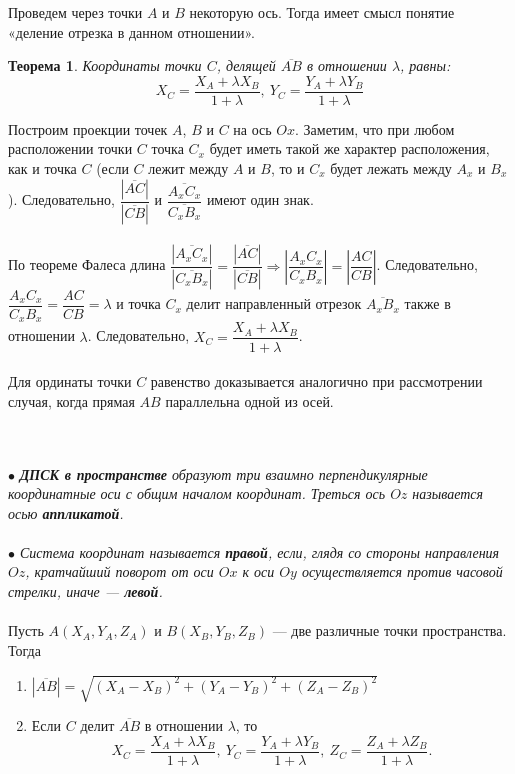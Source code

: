 Проведем через точки $A$ и $B$ некоторую ось. Тогда имеет смысл понятие «деление отрезка в данном отношении».
\newtheorem*{t2_2}{Теорема}\begin{t2_2}Координаты точки $C$, делящей $\overline{AB}$ в отношении $\lambda$, равны: $$X_C = \dfrac{X_A + \lambda X_B}{1+\lambda},\ Y_C = \dfrac{Y_A + \lambda Y_B}{1+\lambda}$$\end{t2_2}\begin{Proof}
	Построим проекции точек $A$, $B$ и $C$ на ось $Ox$. Заметим, что при любом расположении точки $C$ точка $C_x$ будет иметь такой же характер расположения, как и точка $C$ (если $C$ лежит между $A$ и $B$, то и $C_x$ будет лежать между $A_x$ и $B_x$). Следовательно, $\dfrac{|\overline{AC}|}{|\overline{CB}|}$ и $\dfrac{\overline{A_xC_x}}{\overline{C_xB_x}}$ имеют один знак.\\\\
	По теореме Фалеса длина $\dfrac{|\overline{A_xC_x}|}{|\overline{C_xB_x}|} = \dfrac{|\overline{AC}|}{|\overline{CB}|}\Rightarrow\left | \dfrac{A_xC_x}{C_xB_x}  \right | = \left | \dfrac{AC}{CB}  \right |$. Следовательно, $\dfrac{A_xC_x}{C_xB_x} = \dfrac{AC}{CB} = \lambda$ и точка $C_x$ делит направленный отрезок $\overline{A_xB_x}$ также в отношении $\lambda$. Следовательно, $X_C = \dfrac{X_A + \lambda X_B}{1+\lambda}$. \\\\
	Для ординаты точки $C$ равенство доказывается аналогично при рассмотрении случая, когда прямая $AB$ параллельна одной из осей.
\end{Proof}\\\\
$\bullet$ \textit{\textbf{ДПСК в пространстве} образуют три взаимно перпендикулярные координатные оси с общим началом координат.
	Треться ось $Oz$ называется осью \textbf{аппликатой}.\\\\$\bullet$
	Система координат называется \textbf{правой}, если, глядя со стороны направления $Oz$,
	кратчайший поворот от оси $Ox$ к оси $Oy$ осуществляется против часовой стрелки, иначе --- \textbf{левой}.}\\\\
Пусть $A(X_A,Y_A,Z_A)$ и $B(X_B,Y_B,Z_B)$ --- две различные точки пространства. Тогда\begin{enumerate}
	\item $|\overline{AB}| = \sqrt{(X_A - X_B)^2 + (Y_A - Y_B)^2 + (Z_A - Z_B)^2}$
	\item Если $C$ делит $\overline{AB}$ в отношении $\lambda$, то
	$$X_C = \dfrac{X_A + \lambda X_B}{1+\lambda},\ Y_C = \dfrac{Y_A + \lambda Y_B}{1+\lambda},\ Z_C = \dfrac{Z_A + \lambda Z_B}{1+\lambda}.$$
\end{enumerate}







